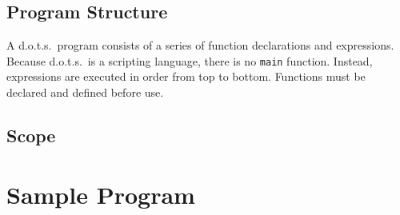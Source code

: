 \documentclass{article}
\newcommand{\pltlang}{d.o.t.s.} %
\newcommand{\code}[1]{\texttt{#1}} %
\begin{document}
\subsection{Program Structure}

A \pltlang\ program consists of a series of function declarations and expressions. Because \pltlang\ is a scripting language, there is no \code{main} function. Instead, expressions are executed in order from top to bottom. Functions must be declared and defined before use. 

\subsection{Scope}

\section{Sample Program}
\end{document}
